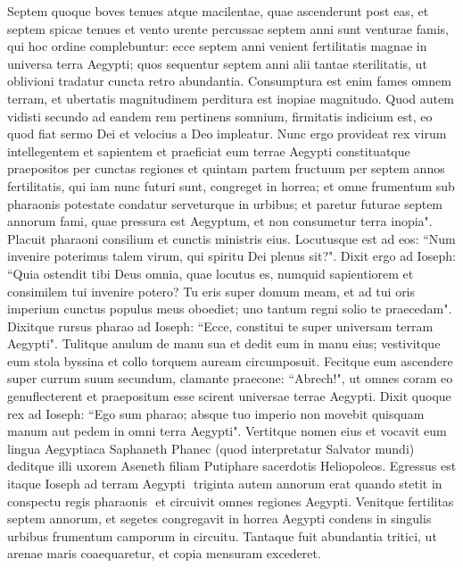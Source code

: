 \begin{biblechapter}
\verse Septem quoque boves tenues atque macilentae, quae ascenderunt post eas, et septem spicae tenues et vento urente percussae septem anni sunt venturae famis, 
\verse qui hoc ordine complebuntur: 
\verse ecce septem anni venient fertilitatis magnae in universa terra Aegypti; 
\verse quos sequentur septem anni alii tantae sterilitatis, ut oblivioni tradatur cuncta retro abundantia. Consumptura est enim fames omnem terram, 
\verse et ubertatis magnitudinem perditura est inopiae magnitudo. 
\verse Quod autem vidisti secundo ad eandem rem pertinens somnium, firmitatis indicium est, eo quod fiat sermo Dei et velocius a Deo impleatur. 
\verse Nunc ergo provideat rex virum intellegentem et sapientem et praeficiat eum terrae Aegypti 
\verse constituatque praepositos per cunctas regiones et quintam partem fructuum per septem annos fertilitatis, 
\verse qui iam nunc futuri sunt, congreget in horrea; et omne frumentum sub pharaonis potestate condatur serveturque in urbibus; 
\verse et paretur futurae septem annorum fami, quae pressura est Aegyptum, et non consumetur terra inopia". 
\verse Placuit pharaoni consilium et cunctis ministris eius. 
\verse Locutusque est ad eos: “Num invenire poterimus talem virum, qui spiritu Dei plenus sit?".  
\verse Dixit ergo ad Ioseph: “Quia ostendit tibi Deus omnia, quae locutus es, numquid sapientiorem et consimilem tui invenire potero? 
\verse Tu eris super domum meam, et ad tui oris imperium cunctus populus meus oboediet; uno tantum regni solio te praecedam". 
\verse Dixitque rursus pharao ad Ioseph: “Ecce, constitui te super universam terram Aegypti". 
\verse Tulitque anulum de manu sua et dedit eum in manu eius; vestivitque eum stola byssina et collo torquem auream circumposuit. 
\verse Fecitque eum ascendere super currum suum secundum, clamante praecone: “Abrech!", ut omnes coram eo genuflecterent et praepositum esse scirent universae terrae Aegypti. 
\verse Dixit quoque rex ad Ioseph: “Ego sum pharao; absque tuo imperio non movebit quisquam manum aut pedem in omni terra Aegypti". 
\verse Vertitque nomen eius et vocavit eum lingua Aegyptiaca Saphaneth Phanec (quod interpretatur Salvator mundi) deditque illi uxorem Aseneth filiam Putiphare sacerdotis Heliopoleos. Egressus est itaque Ioseph ad terram Aegypti 
\verse ­ triginta autem annorum erat quando stetit in conspectu regis pharaonis ­ et circuivit omnes regiones Aegypti. 
\verse Venitque fertilitas septem annorum, et segetes congregavit in horrea Aegypti 
\verse condens in singulis urbibus frumentum camporum in circuitu. 
\verse Tantaque fuit abundantia tritici, ut arenae maris coaequaretur, et copia mensuram excederet. 

\end{biblechapter}
